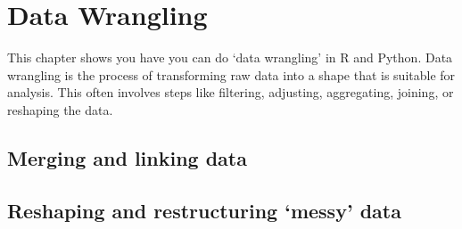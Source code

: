 \chapter{Data Wrangling}

This chapter shows you have you can do `data wrangling' in R and Python.
Data wrangling is the process of transforming raw data into a shape that is suitable for analysis.
This often involves steps like filtering, adjusting, aggregating, joining, or reshaping the data.






\section{Merging and linking  data}
\section{Reshaping and restructuring ‘messy’ data}
